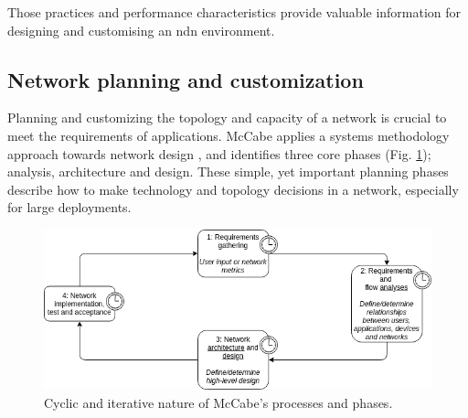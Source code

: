 \documentclass[conference]{IEEEtran}
\begin{document}

Those practices and performance characteristics provide valuable information for designing and customising an \gls{ndn} environment.  

\subsection{Network planning and customization}
Planning and customizing the topology and capacity of a network is crucial to meet the requirements of applications. McCabe applies a systems methodology approach towards network design \cite{mccabe2010network}, and identifies three core phases (Fig. \ref{fig:mccabe-process}); analysis, architecture and design. These simple, yet important planning phases describe how to make technology and topology decisions in a network, especially for large deployments. 

\begin{figure}[H]
\centering
\includegraphics[width=\columnwidth]{images/mccabe-process.png}
\caption{Cyclic and iterative nature of McCabe's processes and phases.}
\label{fig:mccabe-process}
\end{figure}
\end{document}
